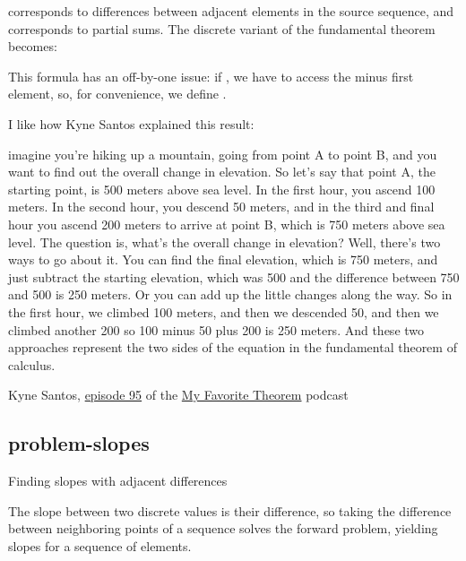 \documentclass{article}
\begin{document}
 corresponds to differences between adjacent elements in the source sequence,
and  corresponds to partial sums.
The discrete variant of the fundamental theorem becomes:


\label{off-by-one}
This formula has an off-by-one issue:
if ,
we have to access the minus first element, so, for convenience,
we define .

I like how Kyne Santos explained this result:

\epigraph{
imagine you're hiking up a mountain, going from point A to point B, and you want to find out the overall change in elevation.
So let's say that point A, the starting point, is 500 meters above sea level.
In the first hour, you ascend 100 meters.
In the second hour, you descend 50 meters, and in the third and final hour you ascend 200 meters to arrive at point B, which is 750 meters above sea level.
The question is, what's the overall change in elevation? Well, there's two ways to go about it.
You can find the final elevation, which is 750 meters, and just subtract the starting elevation, which was 500 and the difference between 750 and 500 is 250 meters.
Or you can add up the little changes along the way.
So in the first hour, we climbed 100 meters, and then we descended 50, and then we climbed another 200 so 100 minus 50 plus 200 is 250 meters.
And these two approaches represent the two sides of the equation in the fundamental theorem of calculus.
}{Kyne Santos, \href{https://kpknudson.com/my-favorite-theorem/2025/5/15/episode-95-kyne-santos}{episode 95} of the \href{https://kpknudson.com/my-favorite-theorem}{My Favorite Theorem} podcast}

\subsection{problem-slopes}{Finding slopes with adjacent differences}

The slope between two discrete values is their difference,
so taking the difference between neighboring points of a sequence solves the forward problem,
yielding  slopes for a sequence of  elements.
\end{document}

